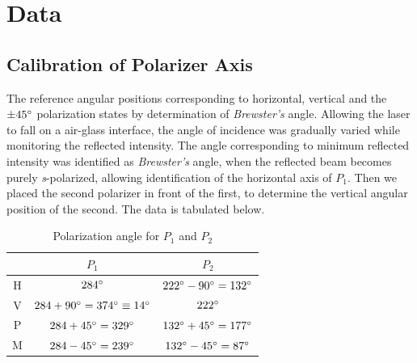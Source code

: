 \section{Data}
\subsection{Calibration of Polarizer Axis}
The  reference angular positions corresponding to horizontal, vertical and the $\pm 45\degree$ polarization states by determination of \textit{Brewster's} angle.  Allowing the laser to fall on a air-glass interface, the angle of incidence was gradually varied while monitoring the reflected intensity. The angle corresponding to minimum reflected intensity was identified as \textit{Brewster's}
angle, when the reflected beam becomes purely \textit{s}-polarized, allowing identification of the horizontal axis of $P_1$. Then we placed the second polarizer in front of the first, to determine the vertical angular position of the second. The data is tabulated below.
\begin{table}[h!]
\centering
\begin{tabular}{c|c|c}
 & $P_1$ & $P_2$ \\
\hline
H & $284\degree$ 
  & $222\degree - 90\degree = 132\degree$ \\
\hline
V & $284 + 90\degree = 374\degree \equiv 14\degree$ 
  & $222\degree$ \\
\hline
P & $284+ 45\degree = 329\degree$ 
  & $132\degree + 45\degree = 177\degree$ \\
\hline
M & $284- 45\degree = 239\degree$ 
  & $132\degree - 45\degree = 87\degree$ \\
\hline
\end{tabular}
\caption{Polarization angle for $P_1$ and $P_2$}
\end{table}
